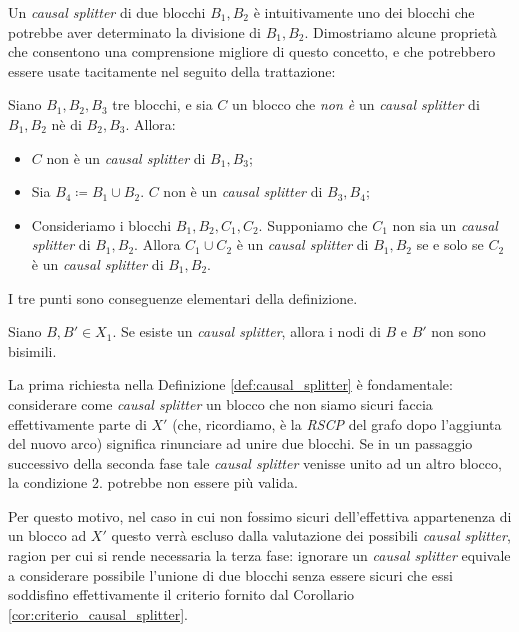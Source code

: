 Un \emph{causal splitter} di due blocchi $B_1,B_2$ è intuitivamente uno dei blocchi che potrebbe aver determinato la divisione di $B_1,B_2$. Dimostriamo alcune proprietà che consentono una comprensione migliore di questo concetto, e che potrebbero essere usate tacitamente nel seguito della trattazione:

\begin{observation}
    Siano $B_1, B_2, B_3$ tre blocchi, e sia $C$ un blocco che \emph{non è} un \emph{causal splitter} di $B_1,B_2$ nè di $B_2,B_3$. Allora:
    \begin{itemize}
        \item $C$ non è un \emph{causal splitter} di $B_1,B_3$;
        \item Sia $B_4 \coloneqq B_1 \cup B_2$. $C$ non è un \emph{causal splitter} di $B_3, B_4$;
        \item Consideriamo i blocchi $B_1, B_2, C_1, C_2$. Supponiamo che $C_1$ non sia un \emph{causal splitter} di $B_1,B_2$. Allora $C_1 \cup C_2$ è un \emph{causal splitter} di $B_1,B_2$ se e solo se $C_2$ è un \emph{causal splitter} di $B_1,B_2$.
    \end{itemize}
\end{observation}
\begin{proof2}
    I tre punti sono conseguenze elementari della definizione.
\end{proof2}

\begin{corollary}
    \label{cor:criterio_causal_splitter}
    Siano $B,B' \in X_1$. Se esiste un \emph{causal splitter}, allora i nodi di $B$ e $B'$ non sono bisimili.
\end{corollary}

La prima richiesta nella Definizione \ref{def:causal_splitter} è fondamentale: considerare come \emph{causal splitter} un blocco che non siamo sicuri faccia effettivamente parte di $X'$ (che, ricordiamo, è la \emph{RSCP} del grafo dopo l'aggiunta del nuovo arco) significa rinunciare ad unire due blocchi. Se in un passaggio successivo della seconda fase tale \emph{causal splitter} venisse unito ad un altro blocco, la condizione 2. potrebbe non essere più valida.

Per questo motivo, nel caso in cui non fossimo sicuri dell'effettiva appartenenza di un blocco ad $X'$ questo verrà escluso dalla valutazione dei possibili \emph{causal splitter}, ragion per cui si rende necessaria la terza fase: ignorare un \emph{causal splitter} equivale a considerare possibile l'unione di due blocchi senza essere sicuri che essi soddisfino effettivamente il criterio fornito dal Corollario \ref{cor:criterio_causal_splitter}.

